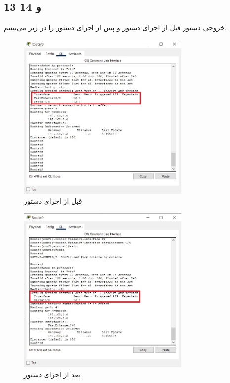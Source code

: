 \documentclass{article}
\begin{document}
\subsection{13 و 14}
خروجی دستور  قبل از اجرای دستور و پس از اجرای دستور را در زیر می‌بینیم.
\begin{figure}[H]
    \centering
    \includegraphics[width=0.75\textwidth]{figures/15.jpg}
    \caption{قبل از اجرای دستور}
    \label{fig:fig1}
\end{figure}
\begin{figure}[H]
    \centering
    \includegraphics[width=0.75\textwidth]{figures/14.jpg}
    \caption{بعد از اجرای دستور}
    \label{fig:fig1}
\end{figure}
\end{document}

